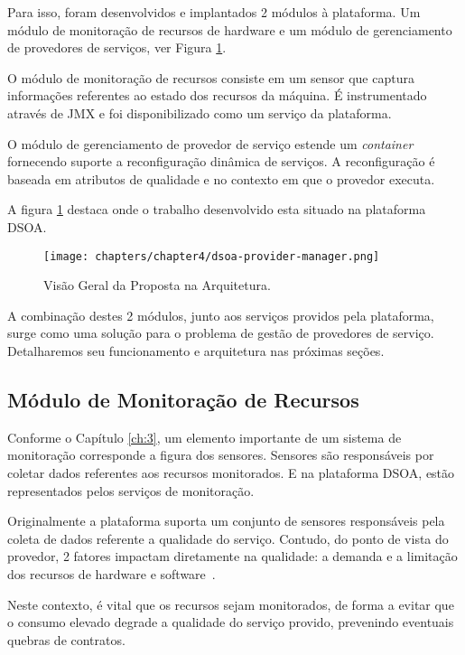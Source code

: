 Para isso, foram desenvolvidos e implantados 2 módulos à plataforma. Um módulo de monitoração de recursos de hardware e um módulo de gerenciamento de provedores de serviços, ver Figura \ref{fig:proposal}.

O módulo de monitoração de recursos consiste em um sensor que captura informações referentes ao estado dos recursos da máquina. É instrumentado através de JMX e foi disponibilizado como um serviço da plataforma. 

O módulo de gerenciamento de provedor de serviço estende um \textit{container} fornecendo suporte a reconfiguração dinâmica de serviços. A reconfiguração é baseada em atributos de qualidade e no contexto em que o provedor executa.

A figura \ref{fig:proposal} destaca onde o trabalho desenvolvido esta situado na plataforma DSOA.

\begin{figure}[htp]
\centering
\texttt{[image: chapters/chapter4/dsoa-provider-manager.png]}
\caption[Visão Geral da Proposta na Arquitetura]{Visão Geral da Proposta na Arquitetura.}
\label{fig:proposal}
\end{figure}

A combinação destes 2 módulos, junto aos serviços providos pela plataforma, surge como uma solução para o problema de gestão de provedores de serviço. Detalharemos seu funcionamento e arquitetura nas próximas seções.


\subsection{Módulo de Monitoração de Recursos}

Conforme o Capítulo \ref{ch:3}, um elemento importante de um sistema de monitoração corresponde a figura dos sensores. Sensores são responsáveis por coletar dados referentes aos recursos monitorados. E na plataforma DSOA, estão representados pelos serviços de monitoração. 

Originalmente a plataforma suporta um conjunto de sensores responsáveis pela coleta de dados referente a qualidade do serviço. Contudo, do ponto de vista do provedor, 2 fatores impactam diretamente na qualidade: a demanda e a limitação dos recursos de hardware e software~\cite{ye2011models}. 

Neste contexto, é vital que os recursos sejam monitorados, de forma a evitar que o consumo elevado degrade a qualidade do serviço provido, prevenindo eventuais quebras de contratos.

